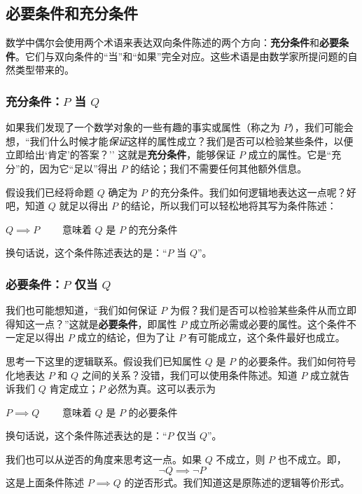 \subsection{必要条件和充分条件}

数学中偶尔会使用两个术语来表达双向条件陈述的两个方向：\textbf{充分条件}和\textbf{必要条件}。它们与双向条件的``当''和``如果''完全对应。这些术语是由数学家所提问题的自然类型带来的。

\subsubsection*{充分条件：$P$ 当 $Q$}

如果我们发现了一个数学对象的一些有趣的事实或属性（称之为 $P$），我们可能会想，``我们什么时候才能\emph{保证}这样的属性成立？我们是否可以检验某些条件，以便立即给出`肯定'的答案？'' 这就是\textbf{充分条件}，能够保证 $P$ 成立的属性。它是``充分''的，因为它``足以''得出 $P$ 的结论；我们不需要任何其他额外信息。

假设我们已经将命题 $Q$ 确定为 $P$ 的充分条件。我们如何逻辑地表达这一点呢？好吧，知道 $Q$ 就足以得出 $P$ 的结论，所以我们可以轻松地将其写为条件陈述：
\begin{center}
    $Q \implies P \qquad$ 意味着 $Q$ 是 $P$ 的充分条件
\end{center}
换句话说，这个条件陈述表达的是：``$P$ 当 $Q$''。

\subsubsection*{必要条件：$P$ 仅当 $Q$}

我们也可能想知道，``我们如何保证 $P$ 为假？我们是否可以检验某些条件从而立即得知这一点？''这就是\textbf{必要条件}，即属性 $P$ 成立所必需或必要的属性。这个条件不一定足以得出 $P$ 成立的结论，但为了让 $P$ 有可能成立，这个条件最好也成立。

思考一下这里的逻辑联系。假设我们已知属性 $Q$ 是 $P$ 的必要条件。我们如何符号化地表达 $P$ 和 $Q$ 之间的关系？没错，我们可以使用条件陈述。知道 $P$ 成立就告诉我们 $Q$ 肯定成立；$P$ 必然为真。这可以表示为
\begin{center}
    $P \implies Q \qquad$ 意味着 $Q$ 是 $P$ 的必要条件
\end{center}
换句话说，这个条件陈述表达的是：``$P$ 仅当 $Q$''。

我们也可以从逆否的角度来思考这一点。如果 $Q$ 不成立，则 $P$ 也不成立。即，
\[\neg Q \implies \neg P\]
这是上面条件陈述 $P \implies Q$ 的逆否形式。我们知道这是原陈述的逻辑等价形式。

